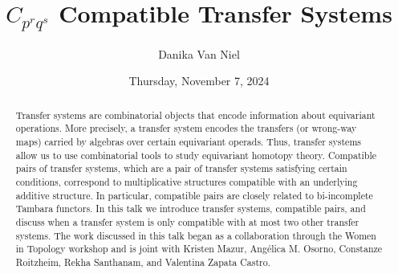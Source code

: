 \documentclass{UAmathtalk}
\author{Danika Van Niel}
\title{$C_{p^r q^s}$ Compatible Transfer Systems}
\date{Thursday, November 7, 2024}
\begin{document}
\maketitle

\begin{abstract}
Transfer systems are combinatorial objects that encode information about equivariant operations. More precisely, a transfer system encodes the transfers (or wrong-way maps) carried by algebras over certain equivariant operads. Thus, transfer systems allow us to use combinatorial tools to study equivariant homotopy theory. Compatible pairs of transfer systems, which are a pair of transfer systems satisfying certain conditions, correspond to multiplicative structures compatible with an underlying additive structure. In particular, compatible pairs are closely related to bi-incomplete Tambara functors. In this talk we introduce transfer systems, compatible pairs, and discuss when a transfer system is only compatible with at most two other transfer systems. The work discussed in this talk began as a collaboration through the Women in Topology workshop and is joint with Kristen Mazur, Angélica M. Osorno, Constanze Roitzheim, Rekha Santhanam, and Valentina Zapata Castro.
\end{abstract}
\end{document}
